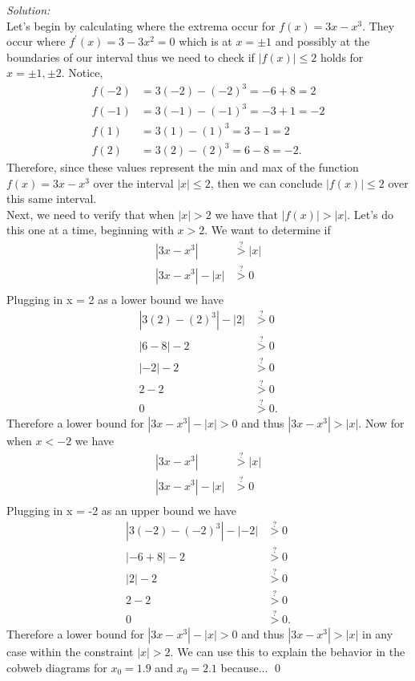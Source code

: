 \documentclass[10pt]{amsart}
\theoremstyle{nonumberplain}
\begin{document}
\begin{enumerate}[label={\bf {\arabic*}:}]
\begin{enumerate}
\textit{Solution:} \\
Let's begin by calculating where the extrema occur for $f(x) = 3x - x^3$.
They occur where $f^\prime(x) = 3 -3x^2 = 0$ which is at $x = \pm 1$ and possibly at the boundaries of our interval thus we need to check if $|f(x)| \leq 2$ holds for $x = \pm 1, \pm 2$.
Notice,
\begin{align*}
f(-2) &= 3(-2) - (-2)^3 = -6 + 8 = 2 \\
f(-1) &= 3(-1) - (-1)^3 = -3 + 1 = - 2 \\
f(1) &= 3(1) - (1)^3 = 3 - 1 = 2 \\
f(2) &= 3(2) - (2)^3 = 6 - 8 = -2.
\end{align*}
Therefore, since these values represent the min and max of the function $f(x) = 3x - x^3$ over the interval $|x| \leq 2$, then we can conclude $|f(x)| \leq 2$ over this same interval. \\

Next, we need to verify that when $|x| > 2$ we have that $|f(x)| > |x|$.
Let's do this one at a time, beginning with $x > 2$.
We want to determine if
\begin{align*}
|3x - x^3| &\overset{?}> |x| \\
|3x - x^3| - |x| &\overset{?}> 0 \\
\end{align*}
Plugging in x = 2 as a lower bound we have
\begin{align*}
|3(2) - (2)^3| - |2| &\overset{?}> 0 \\
|6 - 8| - 2 &\overset{?}> 0 \\
|-2| - 2 &\overset{?}> 0 \\
2 - 2 &\overset{?}> 0 \\
0 &\overset{?}> 0.
\end{align*}
Therefore a lower bound for $|3x - x^3| - |x| > 0$ and thus $|3x - x^3| > |x|$.
Now for when $x < -2$ we have
\begin{align*}
|3x - x^3| &\overset{?}> |x| \\
|3x - x^3| - |x| &\overset{?}> 0 \\
\end{align*}
Plugging in x = -2 as an upper bound we have
\begin{align*}
|3(-2) - (-2)^3| - |-2| &\overset{?}> 0 \\
|-6 + 8| - 2 &\overset{?}> 0 \\
|2| - 2 &\overset{?}> 0 \\
2 - 2 &\overset{?}> 0 \\
0 &\overset{?}> 0.
\end{align*}
Therefore a lower bound for $|3x - x^3| - |x| > 0$ and thus $|3x - x^3| > |x|$ in any case within the constraint $|x| > 2$.
We can use this to explain the behavior in the cobweb diagrams for $x_0 = 1.9$ and $x_0 = 2.1$ because...
\qed \\



\end{enumerate}
\end{enumerate}
\end{document}

